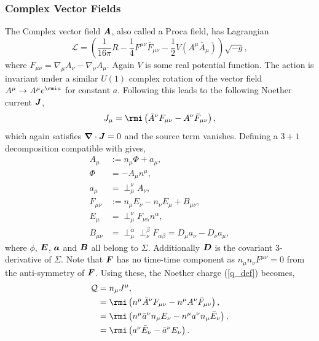 \subsubsection{Complex Vector Fields} \label{sect:noether2}
The Complex vector field $\boldsymbol{A}$, also called a Proca field, has Lagrangian
\begin{equation}
\mathcal{L} = \left(\frac{1}{16 \pi }R -\frac{1}{4}F^{\mu\nu}\bar{F}_{\mu\nu} - \frac{1}{2}V(A^\mu \bar{A}_\mu) \right)\sqrt{-g},
\end{equation}
where $F_{\mu\nu} = \nabla_\mu A_\nu - \nabla_\nu A_\mu$. Again $V$ is some real potential function. The action is invariant under a similar $U(1)$ complex rotation of the vector field $A^\mu \rightarrow A^\mu e^{\rmi a}$ for constant $a$. Following \cite{Minamitsuji_2018} this leads to the following Noether current $\boldsymbol{J}$,
\begin{align}
J_\mu = \rmi\left(\bar{A}^\nu F_{\mu\nu} - A^\nu \bar{F}_{\mu\nu} \right),
\end{align} 
which again satisfies $\boldsymbol{\nabla}\cdot \boldsymbol{J} =0$ and the source term vanishes. Defining a $3+1$ decomposition compatible with \cite{Zilh_o_2015} gives,
\begin{align}
A_\mu &:= n_\mu \Phi + a_\mu, \\
\Phi &= -A_\mu n^\mu, \\
a_\mu &= \perp^\nu_\mu A_\nu, \\
F_{\mu\nu} &:= n_\mu E_\nu - n_\nu E_\mu + B_{\mu\nu}, \\
E_\mu &= \perp^\nu_\mu F_{\nu\alpha}n^\alpha, \\
B_{\mu\nu} &= \perp^\alpha_\mu \perp^\beta_\nu F_{\alpha\beta} = D_\mu a_\nu - D_\nu a_\mu,
\end{align}
where $\phi$, $\boldsymbol{E}$, $\boldsymbol{a}$ and $\boldsymbol{B}$ all belong to $\Sigma$. Additionally $\boldsymbol{D}$ is the covariant 3-derivative of $\Sigma$. Note that $\boldsymbol{F}$ has no time-time component as $n_\mu n_\nu F^{\mu\nu} =0$ from the anti-symmetry of $\boldsymbol{F}$. Using these, the Noether charge (\ref{q_def}) becomes,
\begin{align}
\mathcal{Q}&= n_\mu J^\mu, \\
           &=\rmi\left( n^\mu \bar{A}^\nu F_{\mu\nu} - n^\mu A^\nu \bar{F}_{\mu\nu}  \right), \\
           &=\rmi\left( n^\mu \bar{a}^\nu n_\mu E_\nu - n^\mu a^\nu n_\mu \bar{E}_{\nu}  \right), \\
           &=\rmi\left( a^\nu \bar{E}_{\nu}  - \bar{a}^\nu E_\nu  \right).
\end{align}
